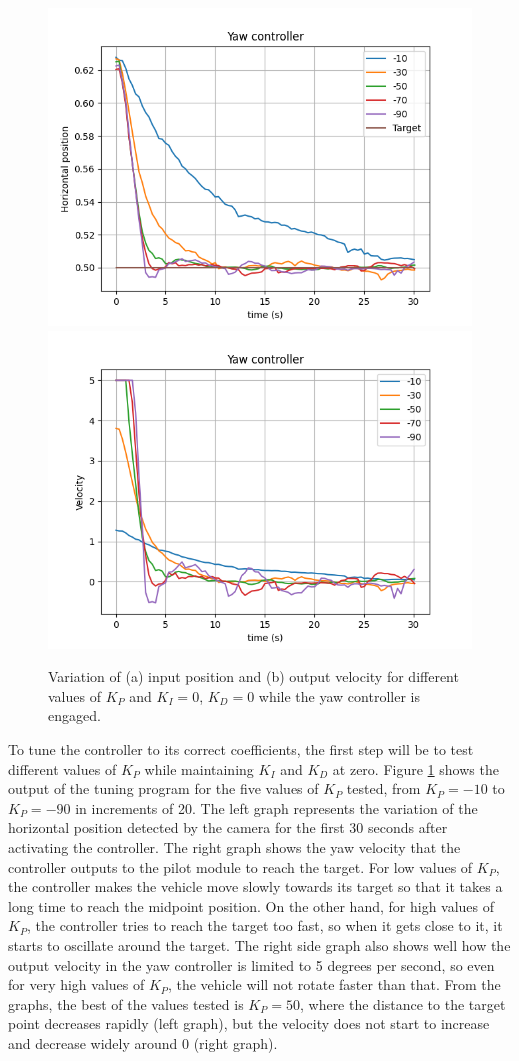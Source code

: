\begin{figure}
  \centering
  \includegraphics[width=.45\linewidth]{img/pid/yaw/yaw_pos_prop_i0_d0.png}
  \includegraphics[width=.45\linewidth]{img/pid/yaw/yaw_vel_prop_i0_d0.png}
  \caption{Variation of (a) input position and (b) output velocity for different values of $K_{P}$ and $K_I=0$, $K_D=0$ while the yaw controller is engaged.}\label{fig:tune-yaw-prop}
\end{figure}

To tune the controller to its correct coefficients, the first step will be to test different values of $K_{P}$ while maintaining $K_{I}$ and $K_{D}$ at zero.
Figure \ref{fig:tune-yaw-prop} shows the output of the tuning program for the five values of $K_{P}$ tested, from $K_P=-10$ to $K_P=-90$ in increments of 20.
The left graph represents the variation of the horizontal position detected by the camera for the first 30 seconds after activating the controller.
The right graph shows the yaw velocity that the controller outputs to the pilot module to reach the target.
For low values of $K_{P}$, the controller makes the vehicle move slowly towards its target so that it takes a long time to reach the midpoint position.
On the other hand, for high values of $K_{P}$, the controller tries to reach the target too fast, so when it gets close to it, it starts to oscillate around the target.
The right side graph also shows well how the output velocity in the yaw controller is limited to 5 degrees per second, so even for very high values of $K_P$, the vehicle will not rotate faster than that.
From the graphs, the best of the values tested is $K_{P}=50$, where the distance to the target point decreases rapidly (left graph), but the velocity does not start to increase and decrease widely around 0 (right graph).

